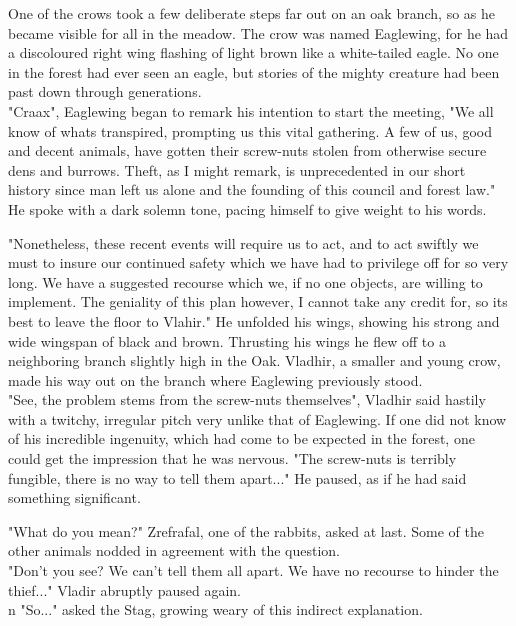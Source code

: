 \documentclass[smalldemyvopaper,11pt,twoside,onecolumn,openright,extrafontsizes]{memoir}
\begin{document}
One of the crows took a few deliberate steps far out on an oak branch, so as he became visible for all in the meadow. The crow was named Eaglewing, for he had a discoloured right wing flashing of light brown like a white-tailed eagle. No one in the forest had ever seen an eagle, but stories of the mighty creature had been past down through generations.\\

"Craax", Eaglewing began to remark his intention to start the meeting, "We all know of whats transpired, prompting us this vital gathering. A few of us, good and decent animals, have gotten their screw-nuts stolen from otherwise secure dens and burrows. Theft, as I might remark, is unprecedented in our short history since man left us alone and the founding of this council and forest law." He spoke with a dark solemn tone, pacing himself to give weight to his words.

"Nonetheless, these recent events will require us to act, and to act swiftly we must to insure our continued safety which we have had to privilege off for so very long. We have a suggested recourse which we, if no one objects, are willing to implement. The geniality of this plan however, I cannot take any credit for, so its best to leave the floor to Vlahir." He unfolded his wings, showing his strong and wide wingspan of black and brown. Thrusting his wings he flew off to a neighboring branch slightly high in the Oak. Vladhir, a smaller and young crow, made his way out on the branch where Eaglewing previously stood.\\

"See, the problem stems from the screw-nuts themselves", Vladhir said hastily with a twitchy, irregular pitch very unlike that of Eaglewing. If one did not know of his incredible ingenuity, which had come to be expected in the forest, one could get the impression that he was nervous. "The screw-nuts is terribly fungible, there is no way to tell them apart..." He paused, as if he had said something significant.  

"What do you mean?" Zrefrafal, one of the rabbits, asked at last. Some of the other animals nodded in agreement with the question.\\

"Don't you see? We can't tell them all apart. We have no recourse to hinder the thief..." Vladir abruptly paused again.\\
n
"So..." asked the Stag, growing weary of this indirect explanation.\\
\end{document}
